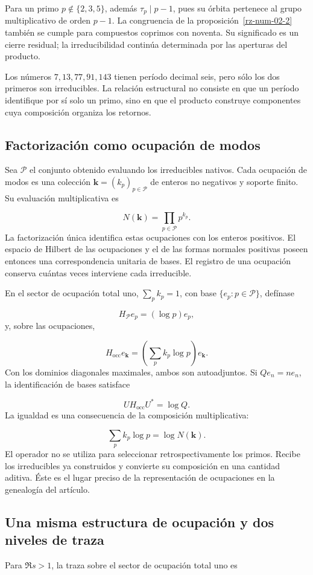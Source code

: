 Para un primo $p\notin\{2,3,5\}$, además $\tau_p\mid p-1$, pues su órbita pertenece al grupo multiplicativo de orden $p-1$. La congruencia de la proposición~\ref{rz-num-02-2} también se cumple para compuestos coprimos con noventa. Su significado es un cierre residual; la irreducibilidad continúa determinada por las aperturas del producto.

Los números $7,13,77,91,143$ tienen período decimal seis, pero sólo los dos primeros son irreducibles. La relación estructural no consiste en que un período identifique por sí solo un primo, sino en que el producto construye componentes cuya composición organiza los retornos.

\subsection{Factorización como ocupación de modos}
Sea $\mathcal P$ el conjunto obtenido evaluando los irreducibles nativos. Cada ocupación de modos es una colección $\mathbf k=(k_p)_{p\in\mathcal P}$ de enteros no negativos y soporte finito. Su evaluación multiplicativa es

\[
N(\mathbf k)=\prod_{p\in\mathcal P}p^{k_p}.
\]
La factorización única identifica estas ocupaciones con los enteros positivos. El espacio de Hilbert de las ocupaciones y el de las formas normales positivas poseen entonces una correspondencia unitaria de bases. El registro de una ocupación conserva cuántas veces interviene cada irreducible.

En el sector de ocupación total uno, \(\sum_p k_p=1\), con base \(\{e_p:p\in\mathcal P\}\), defínase

\[
H_{\mathcal P}e_p=(\log p)e_p,
\]
y, sobre las ocupaciones,

\[
H_{\mathrm{occ}}e_{\mathbf k}
=\left(\sum_pk_p\log p\right)e_{\mathbf k}.
\]
Con los dominios diagonales maximales, ambos son autoadjuntos. Si $Qe_n=ne_n$, la identificación de bases satisface

\[
U H_{\mathrm{occ}}U^*=\log Q.
\]
La igualdad es una consecuencia de la composición multiplicativa:

\[
\sum_pk_p\log p=\log N(\mathbf k).
\]
El operador no se utiliza para seleccionar retrospectivamente los primos. Recibe los irreducibles ya construidos y convierte su composición en una cantidad aditiva. Éste es el lugar preciso de la representación de ocupaciones en la genealogía del artículo.

\subsection{Una misma estructura de ocupación y dos niveles de traza}
Para $\Re s>1$, la traza sobre el sector de ocupación total uno es

